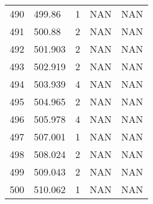 \documentclass{article}
\begin{document}
\begin{longtable}{@{}lllll@{}}
				490 & 499.86  & 1     & NAN   & NAN   \\
				491 & 500.88  & 2     & NAN   & NAN   \\
				492 & 501.903 & 2     & NAN   & NAN   \\
				493 & 502.919 & 2     & NAN   & NAN   \\
				494 & 503.939 & 4     & NAN   & NAN   \\
				495 & 504.965 & 2     & NAN   & NAN   \\
				496 & 505.978 & 4     & NAN   & NAN   \\
				497 & 507.001 & 1     & NAN   & NAN   \\
				498 & 508.024 & 2     & NAN   & NAN   \\
				499 & 509.043 & 2     & NAN   & NAN   \\
				500 & 510.062 & 1     & NAN   & NAN   \\* \bottomrule
			\end{longtable}
			\newpage
			
\end{document}
